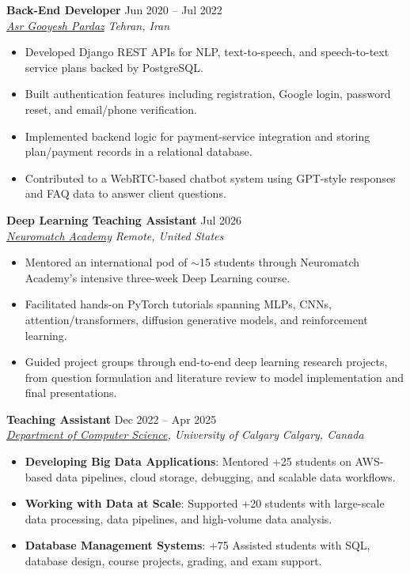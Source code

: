 \documentclass[a4paper,10pt]{article}
\newcommand{\resumeSubheading}[4]{
    \textbf{#1} \hfill #2 \\
    \textit{#3} \hfill \textit{#4}
}
\begin{document}
\resumeSubheading
{Back-End Developer}
{Jun 2020 -- Jul 2022}
{\href{https://asr-gooyesh.com/en/}{Asr Gooyesh Pardaz}}
{Tehran, Iran}
\begin{itemize}[leftmargin=0.25in]
    \item Developed Django REST APIs for NLP, text-to-speech, and speech-to-text service plans backed by PostgreSQL.
    \item Built authentication features including registration, Google login, password reset, and email/phone verification.
    \item Implemented backend logic for payment-service integration and storing plan/payment records in a relational database.
    \item Contributed to a WebRTC-based chatbot system using GPT-style responses and FAQ data to answer client questions.
\end{itemize}

\resumeSubheading
{Deep Learning Teaching Assistant}
{Jul 2026}
{\href{https://neuromatch.io/}{Neuromatch Academy}}
{Remote, United States}
\begin{itemize}[leftmargin=0.25in]
    \item Mentored an international pod of $\sim$15 students through Neuromatch Academy's intensive three-week Deep Learning course.
    \item Facilitated hands-on PyTorch tutorials spanning MLPs, CNNs, attention/transformers, diffusion generative models, and reinforcement learning.
    \item Guided project groups through end-to-end deep learning research projects, from question formulation and literature review to model implementation and final presentations.
\end{itemize}

\resumeSubheading
{Teaching Assistant}
{Dec 2022 -- Apr 2025}
{\href{https://science.ucalgary.ca/computer-science} {Department of Computer Science}, University of Calgary}
{Calgary, Canada}
\begin{itemize}[leftmargin=0.25in]
    \item \textbf{Developing Big Data Applications}: Mentored +25 students on AWS-based data pipelines, cloud storage, debugging, and scalable data workflows.
    \item \textbf{Working with Data at Scale}: Supported +20 students with large-scale data processing, data pipelines, and high-volume data analysis.
    \item \textbf{Database Management Systems}: +75 Assisted students with SQL, database design, course projects, grading, and exam support.
\end{itemize}
\end{document}
